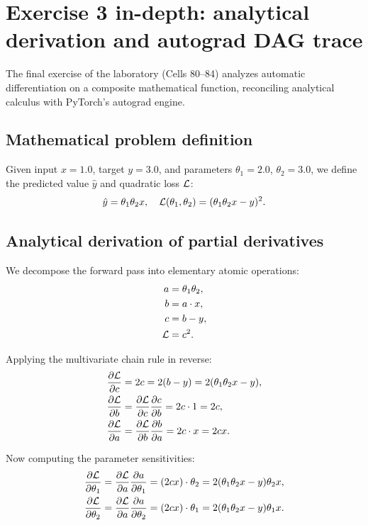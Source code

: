 \documentclass[../labs.tex]{subfiles}
\begin{document}
\section{Exercise 3 in-depth: analytical derivation and autograd DAG trace}

The final exercise of the laboratory (Cells 80--84) analyzes automatic differentiation on a composite mathematical function, reconciling analytical calculus with PyTorch's autograd engine.

\subsection{Mathematical problem definition}
Given input $x = 1.0$, target $y = 3.0$, and parameters $\theta_1 = 2.0$, $\theta_2 = 3.0$, we define the predicted value $\hat{y}$ and quadratic loss $\mathcal{L}$:
\begin{equation}
\label{eq:lab01_ex3_loss}
\hat{y} = \theta_1 \theta_2 x, \quad \mathcal{L}(\theta_1, \theta_2) = (\theta_1 \theta_2 x - y)^2.
\end{equation}

\subsection{Analytical derivation of partial derivatives}
We decompose the forward pass into elementary atomic operations:
\begin{align}
a &= \theta_1 \theta_2, \\
b &= a \cdot x, \\
c &= b - y, \\
\mathcal{L} &= c^2.
\end{align}

Applying the multivariate chain rule in reverse:
\begin{align}
\frac{\partial \mathcal{L}}{\partial c} &= 2c = 2(b - y) = 2(\theta_1 \theta_2 x - y), \\
\frac{\partial \mathcal{L}}{\partial b} &= \frac{\partial \mathcal{L}}{\partial c} \frac{\partial c}{\partial b} = 2c \cdot 1 = 2c, \\
\frac{\partial \mathcal{L}}{\partial a} &= \frac{\partial \mathcal{L}}{\partial b} \frac{\partial b}{\partial a} = 2c \cdot x = 2cx.
\end{align}

Now computing the parameter sensitivities:
\begin{align}
\label{eq:analytical_theta1}
\frac{\partial \mathcal{L}}{\partial \theta_1} &= \frac{\partial \mathcal{L}}{\partial a} \frac{\partial a}{\partial \theta_1} = (2cx) \cdot \theta_2 = 2(\theta_1 \theta_2 x - y) \theta_2 x, \\
\label{eq:analytical_theta2}
\frac{\partial \mathcal{L}}{\partial \theta_2} &= \frac{\partial \mathcal{L}}{\partial a} \frac{\partial a}{\partial \theta_2} = (2cx) \cdot \theta_1 = 2(\theta_1 \theta_2 x - y) \theta_1 x.
\end{align}
\end{document}

